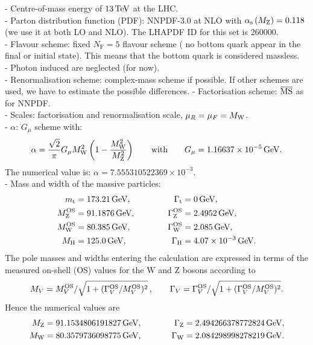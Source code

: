 \documentclass[a4paper,10pt]{report}
\begin{document}
- Centre-of-mass energy of $13\,\text{TeV}$ at the LHC. \\
%
- Parton distribution function (PDF): NNPDF-3.0 at NLO with $\alpha_{\rm s} \left( M_\text{Z} \right) = 0.118$ (we use it at both LO and NLO). The
LHAPDF ID for this set is 260000.\\
%
- Flavour scheme: fixed $N_\text{F}=5$ flavour scheme ( no bottom quark appear in the final or initial state). 
This means that the bottom quark is considered massless. \\
%
- Photon induced are neglected (for now). \\
%
- Renormalisation scheme: complex-mass scheme if possible. If other schemes are used, we have to estimate the possible differences.
%
- Factorisation scheme: ${\overline{\rm MS}}$ as for NNPDF. \\
%
- Scales: factorisation and renormalisation scale, $\mu_R = \mu_F = M_\text{W}$. \\
%
- $\alpha$: $G_\mu$ scheme with:
%
\begin{equation}
  \alpha = \frac{\sqrt{2}}{\pi} G_\mu M_\text{W}^2 \left( 1 - \frac{M_\text{W}^2}{M_\text{Z}^2} \right)  \qquad \text{with}  \qquad   G_\mu    = 1.16637\times 10^{-5}\,\text{GeV}.            
\end{equation}
%
The numerical value is: $\alpha = 7.555310522369 \times 10^{-3}$. \\
%
- Mass and width of the massive particles:
% 
\begin{alignat}{2}
                  m_\text{t}   &=  173.21\,\text{GeV},       & \quad \quad \quad \Gamma_\text{t} &= 0 \,\text{GeV},  \nonumber \\
                M_\text{Z}^\text{OS} &=  91.1876\,\text{GeV},      & \quad \quad \quad \Gamma_\text{Z}^\text{OS} &= 2.4952\,\text{GeV},  \nonumber \\
                M_\text{W}^\text{OS} &=  80.385\,\text{GeV},       & \Gamma_\text{W}^\text{OS} &= 2.085\,\text{GeV},  \nonumber \\
                M_{\rm H} &=  125.0\,\text{GeV},       &  \Gamma_\text{H}   &=  4.07 \times 10^{-3}\,\text{GeV}.
\end{alignat}
%
The pole masses and widths entering the calculation are expressed in terms of the measured on-shell (OS) values for the W and Z bosons according to
%
\begin{equation}
        M_V = M_V^\text{OS}/\sqrt{1+(\Gamma_V^\text{OS}/M_V^\text{OS})^2}\,,\qquad  \Gamma_V = \Gamma_V^\text{OS}/\sqrt{1+(\Gamma_V^\text{OS}/M_V^\text{OS})^2}.
\end{equation}
%
Hence the numerical values are
\begin{alignat}{2}
                M_\text{Z} &=  91.1534806191827\,\text{GeV},      & \quad \quad \quad \Gamma_\text{Z} &= 2.494266378772824\,\text{GeV},  \nonumber \\
                M_\text{W} &=  80.3579736098775\,\text{GeV},       & \Gamma_\text{W} &= 2.084298998278219\,\text{GeV}.
\end{alignat}
\end{document}
